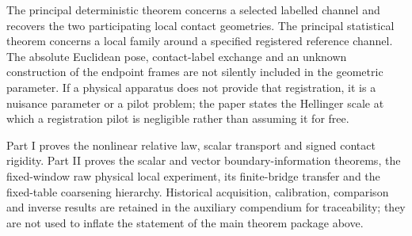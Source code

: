 The principal deterministic theorem concerns a selected labelled channel and
recovers the two participating local contact geometries.  The principal
statistical theorem concerns a local family around a specified registered
reference channel.  The absolute Euclidean pose, contact-label exchange and an
unknown construction of the endpoint frames are not silently included in the
geometric parameter.  If a physical apparatus does not provide that
registration, it is a nuisance parameter or a pilot problem; the paper states
the Hellinger scale at which a registration pilot is negligible rather than
assuming it for free.

Part I proves the nonlinear relative law, scalar transport and signed contact
rigidity.  Part II proves the scalar and vector boundary-information theorems,
the fixed-window raw physical local experiment, its finite-bridge transfer and
the fixed-table coarsening hierarchy.  Historical acquisition, calibration,
comparison and inverse results are retained in the auxiliary compendium for
traceability; they are not used to inflate the statement of the main theorem
package above.
